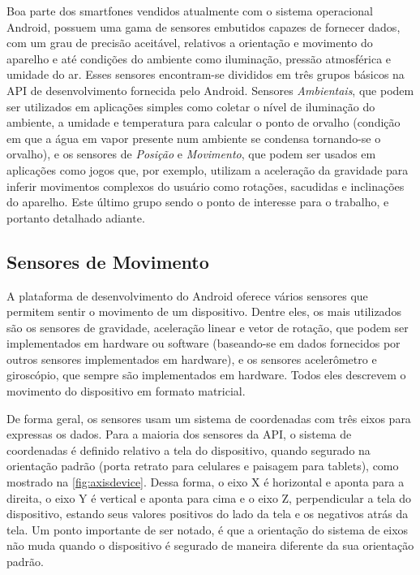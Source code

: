 Boa parte dos smartfones vendidos atualmente com o sistema operacional Android, possuem uma gama de sensores embutidos capazes de fornecer dados, com um grau de precisão aceitável, relativos a orientação e movimento do aparelho e até condições do ambiente como iluminação, pressão atmosférica e umidade do ar.  Esses sensores encontram-se divididos em três grupos básicos na API de desenvolvimento fornecida pelo Android. Sensores \textit{Ambientais}, que podem ser utilizados em aplicações simples como coletar o nível de iluminação do ambiente, a umidade e temperatura para calcular o ponto de orvalho (condição em que a água em vapor presente num ambiente se condensa tornando-se o orvalho), e os sensores de \textit{Posição} e \textit{Movimento}, que podem ser usados em aplicações como jogos que, por exemplo, utilizam a aceleração da gravidade para inferir movimentos complexos do usuário como rotações, sacudidas e inclinações do aparelho. Este último grupo sendo o ponto de interesse para o trabalho, e portanto detalhado adiante.\par

\subsection{Sensores de Movimento}
\label{subsec:motionsensors}

A plataforma de desenvolvimento do Android oferece vários sensores que permitem sentir o movimento de um dispositivo. Dentre eles, os mais utilizados são os sensores de gravidade, aceleração linear e vetor de rotação, que podem ser implementados em hardware ou software (baseando-se em dados fornecidos por outros sensores implementados em hardware), e os sensores acelerômetro e giroscópio, que sempre são implementados em hardware. Todos eles descrevem o movimento do dispositivo em formato matricial.\par

De forma geral, os sensores usam um sistema de coordenadas com três eixos para expressas os dados. Para a maioria dos sensores da API, o sistema de coordenadas é definido relativo a tela do dispositivo, quando segurado na orientação padrão (porta retrato para celulares e paisagem para tablets), como mostrado na \autoref{fig:axisdevice}. Dessa forma, o eixo X é horizontal e aponta para a direita, o eixo Y é vertical e aponta para cima e o eixo Z, perpendicular a tela do dispositivo, estando seus valores positivos do lado da tela e os negativos atrás da tela. Um ponto importante de ser notado, é que a orientação do sistema de eixos não muda quando o dispositivo é segurado de maneira diferente da sua orientação padrão.\par

